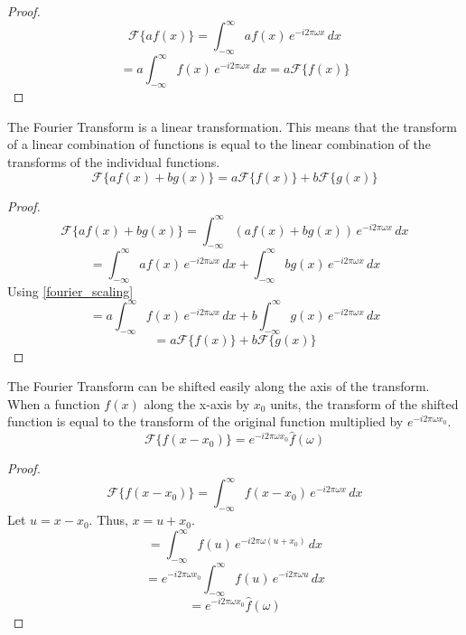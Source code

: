 \begin{proof}
    \[ \mathcal{F}\{ a f(x) \} = \int_{-\infty}^{\infty} a f(x) \, e^{-i 2\pi \omega x} \,dx \]
    \[ = a \int_{-\infty}^{\infty} f(x) \, e^{-i 2\pi \omega x} \,dx = a \mathcal{F}\{ f(x) \} \]
\end{proof}


\begin{theorem}
    \label{fourier_linearity}
    The Fourier Transform is a linear transformation. This means that the transform of a linear combination of functions is equal to the linear combination of the transforms of the individual functions.
    \[ \mathcal{F}\{ a f(x) + b g(x) \} = a \mathcal{F}\{ f(x) \} + b \mathcal{F}\{ g(x) \} \]
\end{theorem}
\begin{proof}
    \[ \mathcal{F}\{ a f(x) + b g(x) \} = \int_{-\infty}^{\infty} (a f(x) + b g(x)) \, e^{-i 2\pi \omega x} \,dx \]
    \[ = \int_{-\infty}^{\infty} a f(x) \, e^{-i 2\pi \omega x} \,dx + \int_{-\infty}^{\infty} b g(x) \, e^{-i 2\pi \omega x} \,dx \]
    Using \cref{fourier_scaling}
    \[ = a \int_{-\infty}^{\infty} f(x) \, e^{-i 2\pi \omega x} \,dx + b \int_{-\infty}^{\infty} g(x) \, e^{-i 2\pi \omega x} \,dx \]
    \[ = a \mathcal{F}\{ f(x) \} + b \mathcal{F}\{ g(x) \} \]
\end{proof}


\begin{theorem}
    \label{fourier_shift}
    The Fourier Transform can be shifted easily along the axis of the transform. When a function \(f(x)\) along the x-axis by \(x_0\) units, the transform of the shifted function is equal to the transform of the original function multiplied by $e^{-i 2\pi \omega x_0}$.
    \[ \mathcal{F}\{ f(x - x_0) \} = e^{-i 2\pi \omega x_0} \hat{f}(\omega) \]
\end{theorem}

\begin{proof}
    \[ \mathcal{F}\{ f(x - x_0) \} = \int_{-\infty}^{\infty} f(x - x_0) \, e^{-i 2\pi \omega x} \,dx \]
    Let \(u = x - x_0\). Thus, \(x = u + x_0\).
    \[ = \int_{-\infty}^{\infty} f(u) \, e^{-i 2\pi \omega (u + x_0)} \,dx \]
    \[ = e^{-i 2\pi \omega x_0} \int_{-\infty}^{\infty} f(u) \, e^{-i 2\pi \omega u} \,dx \]
    \[ = e^{-i 2\pi \omega x_0} \hat{f}(\omega) \]
\end{proof}

